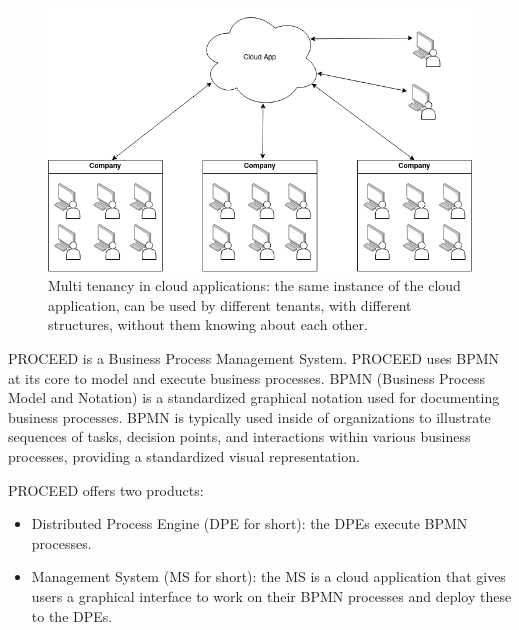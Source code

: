 \begin{figure}[H]
    \centering
    \includegraphics[scale=0.45]{images/mt-cloud-services.png}
    \caption{Multi tenancy in cloud applications: the same instance of the cloud
    application, can be used by different tenants, with different structures, without them knowing about each other.}
    \vspace{-1em} %
    \label{fig:multi-tenant=cloud-applications}
\end{figure}

PROCEED%
is a Business Process Management System.
PROCEED uses BPMN at its core to model and execute business processes.
BPMN (Business Process Model and Notation) is a standardized graphical notation used for documenting business processes.
BPMN is typically used inside of organizations to illustrate sequences of tasks,
decision points, and interactions within various business processes, providing a standardized visual representation.

PROCEED offers two products:
\begin{itemize}
    \item Distributed Process Engine (DPE for short): the DPEs execute BPMN processes.
    \item Management System (MS for short): the MS is a cloud application that gives users
      a graphical interface to work on their BPMN processes and deploy these to the DPEs.
\end{itemize}


